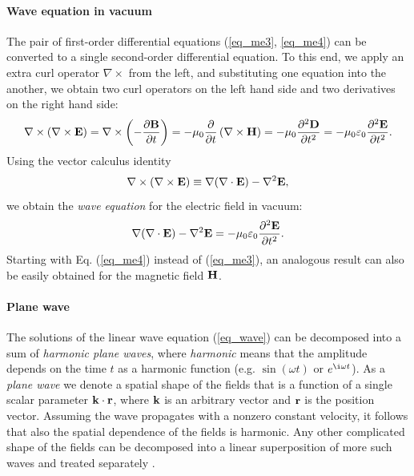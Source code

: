 \paragraph{Wave equation in vacuum} %
The pair of first-order differential equations (\ref{eq_me3}, \ref{eq_me4}) can be converted to a single second-order differential equation. To this end, we apply an extra curl operator $\nabla\times$ from the left, and substituting one equation into the another, we obtain two curl operators on the left hand side and two derivatives on the right hand side: 
\label{starttext}
\begin{equation} \nabla\times (\nabla\times \mathbf{E}) = \nabla\times \left(- \frac{\partial \mathbf{B}} {\partial t}\right) = -\mu_0 \frac{\partial}{\partial t} \left(\nabla\times \mathbf{H}\right) 
= -\mu_0 \frac{\partial^{2} \mathbf{D}}{\partial t^{2}} = -\mu_0 \varepsilon_0 \frac{\partial^{2} \mathbf{E}}{\partial t^{2}}.  \label{eq_elim}\end{equation}
Using the vector calculus identity
\begin{equation} \nabla\times (\nabla\times \mathbf{E}) \equiv \nabla (\nabla \cdot \mathbf{E}) - \nabla^2 \mathbf{E}, \label{eq_rotrot}\end{equation}
we obtain the \textit{wave equation} for the electric field in vacuum: 
\begin{equation}  \nabla (\nabla \cdot \mathbf{E}) - \nabla^2 \mathbf{E} = -\mu_0 \varepsilon_0 \frac{\partial^{2} \mathbf{E}}{\partial t^{2}}.  \label{eq_wave}\end{equation}
Starting with Eq. (\ref{eq_me4}) instead of (\ref{eq_me3}), an analogous result can also be easily obtained for the magnetic field $\mathbf{H}$.

\paragraph{Plane wave} %
The solutions of the linear wave equation (\ref{eq_wave}) can be decomposed into a sum of \textit{harmonic plane waves}, where \textit{harmonic} means that the amplitude depends on the time $t$ as a harmonic function (e.g. $\sin(\omega t)$ or $e^{\i \omega t}$). As a \textit{plane wave} we denote a spatial shape of the fields that is a function of a single scalar parameter ${\mathbf{k}}\cdot{\mathbf{r}}$, where ${\mathbf{k}}$ is an arbitrary vector \textit{} and ${\mathbf{r}}$ is the position vector. Assuming the wave propagates with a nonzero constant velocity, it follows that also the spatial dependence of the fields is harmonic. Any other complicated shape of the fields can be decomposed into a linear superposition of more such waves and treated separately \cite{jackson1962book}. 

